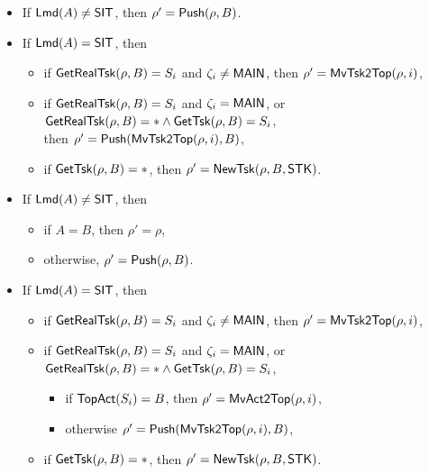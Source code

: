 

\smallskip
\noindent {}
	\begin{itemize}
		\item If ${\sf Lmd}(A) \neq {\sf SIT}$, then $\rho'= \mathsf{Push}(\rho,B)$.
		\item If ${\sf Lmd}(A) = {\sf SIT}$, then
    		\begin{itemize}
                \item if $\mathsf{GetRealTsk}(\rho,B) = S_i$ and $\zeta_i\neq{\sf MAIN}$, then $\rho'=\mathsf{MvTsk2Top}(\rho, i)$,
                \item if $\mathsf{GetRealTsk}(\rho,B) = S_i$ and $\zeta_i = {\sf MAIN}$, or $\mathsf{GetRealTsk}(\rho,B) = *\wedge \mathsf{GetTsk}(\rho,B) = S_i$, \\then $\rho'=\mathsf{Push}(\mathsf{MvTsk2Top}(\rho, i),B)$,
    			\item if $\mathsf{GetTsk}(\rho, B)=*$, then $\rho'= \mathsf{NewTsk}(\rho, B, {\sf STK})$.
    		\end{itemize}
	\end{itemize}

\noindent  {}
	\begin{itemize}
		\item  If ${\sf Lmd}(A) \neq {\sf SIT}$, then
        \begin{itemize}
            \item if $A = B$, then $\rho' = \rho$,
            \item otherwise, $\rho' = \mathsf{Push}(\rho, B)$.
        \end{itemize}
		\item If ${\sf Lmd}(A) = {\sf SIT}$, then
    		\begin{itemize}
                \item if $\mathsf{GetRealTsk}(\rho,B) = S_i$ and $\zeta_i\neq{\sf MAIN}$, then $\rho'=\mathsf{MvTsk2Top}(\rho, i)$,
                \item if $\mathsf{GetRealTsk}(\rho,B) = S_i$ and $\zeta_i = {\sf MAIN}$, or $\mathsf{GetRealTsk}(\rho,B) = *\wedge \mathsf{GetTsk}(\rho,B) = S_i$, 
                \begin{itemize}
                    \item if $\mathsf{TopAct}(S_i) = B$, then $\rho' = \mathsf{MvAct2Top}(\rho,i)$,
                    \item otherwise $\rho'=\mathsf{Push}(\mathsf{MvTsk2Top}(\rho, i),B)$,
                \end{itemize}
    			\item if $\mathsf{GetTsk}(\rho, B)=*$, then $\rho'= \mathsf{NewTsk}(\rho,B, {\sf STK})$.
    		\end{itemize}
	 \end{itemize}
	
